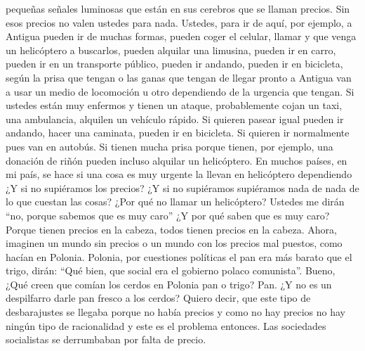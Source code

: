 pequeñas señales luminosas que están en sus cerebros que se llaman precios. Sin esos precios no valen ustedes para nada. Ustedes, para ir de aquí, por ejemplo, a Antigua pueden ir de muchas formas, pueden coger el celular, llamar y que venga un helicóptero a buscarlos, pueden alquilar una limusina, pueden ir en carro, pueden ir en un transporte público, pueden ir andando, pueden ir en bicicleta, según la prisa que tengan o las ganas que tengan de llegar pronto a Antigua van a usar un medio de locomoción u otro dependiendo de la urgencia que tengan. Si ustedes están muy enfermos y tienen un ataque, probablemente cojan un taxi, una ambulancia, alquilen un vehículo rápido. Si quieren pasear igual pueden ir andando, hacer una caminata, pueden ir en bicicleta. Si quieren ir normalmente pues van en autobús. Si tienen mucha prisa porque tienen, por ejemplo, una donación de riñón pueden incluso alquilar un helicóptero. En muchos países, en mi país, se hace si una cosa es muy urgente la llevan en helicóptero dependiendo ¿Y si no supiéramos los precios? ¿Y si no supiéramos supiéramos nada de nada de lo que cuestan las cosas? ¿Por qué no llamar un helicóptero? Ustedes me dirán \enquote{no, porque sabemos que es muy caro} ¿Y por qué saben que es muy caro? Porque tienen precios en la cabeza, todos tienen precios en la cabeza. Ahora, imaginen un mundo sin precios o un mundo con los precios mal puestos, como hacían en Polonia. Polonia, por cuestiones políticas el pan era más barato que el trigo, dirán: \enquote{Qué bien, que social era el gobierno polaco comunista}. Bueno, ¿Qué creen que comían los cerdos en Polonia pan o trigo? Pan. ¿Y no es un despilfarro darle pan fresco a los cerdos? Quiero decir, que este tipo de desbarajustes se llegaba porque no había precios y como no hay precios no hay ningún tipo de racionalidad y este es el problema entonces. Las sociedades socialistas se derrumbaban por falta de precio.

